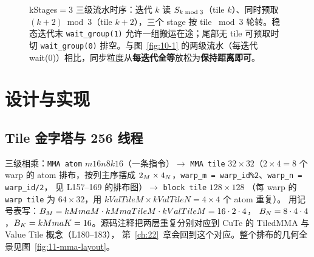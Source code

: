 \begin{figure}[H]
\caption{kStages$=3$ 三级流水时序：迭代 $k$ 读 $S\sb{k\bmod3}$（tile $k$）、同时预取 $(k{+}2)\bmod3$（tile $k{+}2$），三个 stage 按 tile $\bmod 3$ 轮转。稳态迭代末 \texttt{wait\_group(1)} 允许一组搬运在途；尾部无 tile 可预取时切 \texttt{wait\_group(0)} 排空。与图~\ref{fig:10-1} 的两级流水（每迭代 wait(0)）相比，同步粒度从\textbf{每迭代全等}放松为\textbf{保持距离即可}。}
\label{fig:11-kstages3}
\end{figure}

\section{设计与实现}

\subsection{Tile 金字塔与 256 线程}



三级相乘：\texttt{MMA atom} $m16n8k16$（一条指令）$\to$
\texttt{MMA tile} $32\times32$（$2\times4 = 8$ 个 warp 的 atom 排布，按列主序摆成
$2\sb {M}\times4\sb {N}$，\texttt{warp\_m = warp\_id\%2}、\texttt{warp\_n = warp\_id/2}，
见 L157--169 的排布图）$\to$ \texttt{block tile} $128\times128$
（每 warp 的 \texttt{warp tile} 为 $64\times32$，用
$kValTileM\times kValTileN = 4\times4$ 个 atom 重复）。
用记号表写：$B\sb M = kMmaM \cdot kMmaTileM \cdot kValTileM = 16\cdot2\cdot4$，
$B\sb N = 8\cdot4\cdot4$，$B\sb K = kMmaK = 16$。源码注释把两层重复分别对应到
CuTe 的 TiledMMA 与 Value Tile 概念（L180--183），
第~\ref{ch:22}~章会回到这个对应。整个排布的几何全景见图~\ref{fig:11-mma-layout}。

